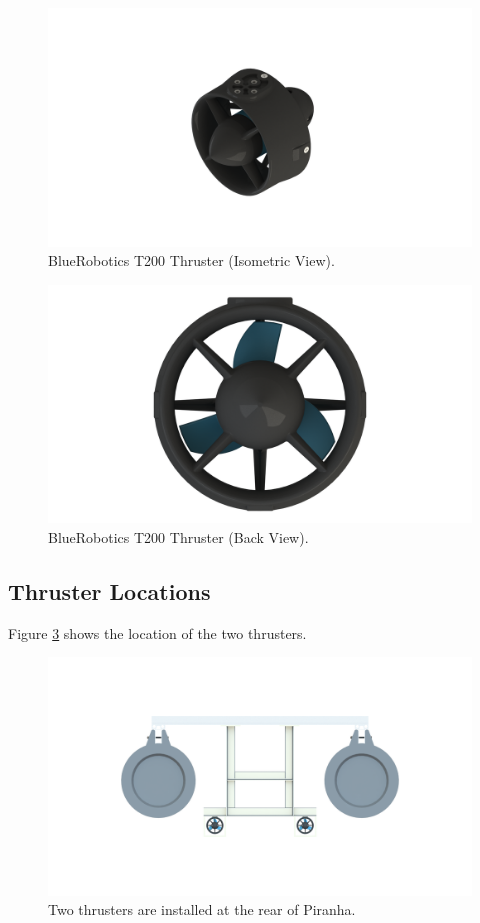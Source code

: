 \begin{figure}[H]
    \centering
    \includegraphics[width=.8\textwidth]{images/02t200-thruster.png}
    \caption{BlueRobotics T200 Thruster (Isometric View).}
    \label{fig:02t200-3d}
\end{figure}

\begin{figure}[H]
    \centering
    \includegraphics[width=.8\textwidth]{images/02t200-thruster-back.png}
    \caption{BlueRobotics T200 Thruster (Back View).}
    \label{fig:02t200-back}
\end{figure}

\subsection{Thruster Locations}

Figure \ref{fig:02orca-thruster} shows the location of the two thrusters.

\begin{figure}[H]
    \centering
    \includegraphics[width=.8\textwidth]{images/02orca-thruster.png}
    \caption{Two thrusters are installed at the rear of Piranha.}
    \label{fig:02orca-thruster}
\end{figure}